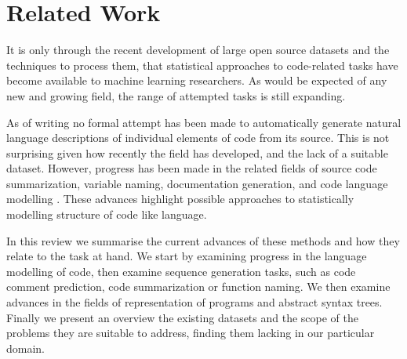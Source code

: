 \chapter{Related Work}

It is only through the recent development of large open source datasets and the techniques to process them, that statistical approaches to code-related tasks have become available to machine learning researchers. 
As would be expected of any new and growing field, the range of attempted tasks is still expanding. 


As of writing no formal attempt has been made to automatically generate natural language descriptions of individual elements of code from its source.  
This is not surprising given how recently the field has developed, and the lack of a suitable dataset.
However, progress has been made in the related fields of source code summarization, variable naming, documentation generation, and code language modelling \citep{allamanis_survey_2017}.  
These advances highlight possible approaches to statistically modelling structure of code like language.  

In this review we summarise the current advances of these methods and how they relate to the task at hand.  We start by examining progress in the language modelling of code, then examine sequence generation tasks, such as code comment prediction, code summarization or function naming. We then examine advances in the fields of representation of programs and abstract syntax trees. Finally we present an overview the existing datasets and the scope of the problems they are suitable to address, finding them lacking in our particular domain.



